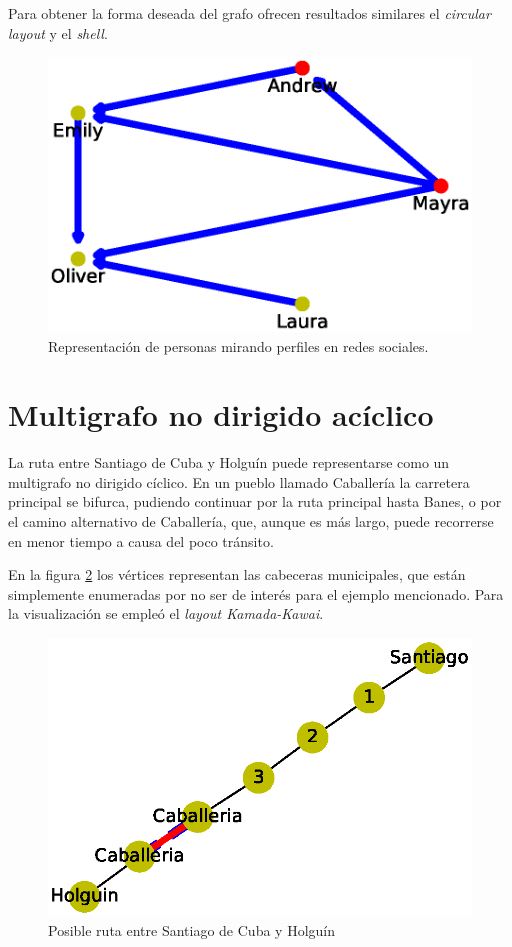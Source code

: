 \documentclass{article}
\begin{document}
Para obtener la forma deseada del grafo ofrecen resultados similares el \textit{circular layout} y el \textit{shell}.


\begin{figure}
\begin{center}
  \includegraphics[width=.6\columnwidth]{fig6.eps}
  \end{center}
  \vspace*{-12mm}
  \caption{Representación de personas mirando perfiles en redes sociales.}
  \label{Figura 6}
\end{figure}




\section{Multigrafo no dirigido acíclico}

La ruta entre Santiago de Cuba y Holguín puede representarse  como un multigrafo no dirigido cíclico. En un pueblo llamado Caballería la carretera principal se bifurca, pudiendo continuar por la ruta principal hasta Banes, o por el camino alternativo de Caballería, que, aunque es más largo, puede recorrerse en menor tiempo a causa del poco tránsito.

En la figura \ref{Figura 7} los vértices representan las cabeceras municipales, que están simplemente enumeradas por no ser de interés para el ejemplo mencionado. Para la visualización se empleó el \textit{layout Kamada-Kawai}.

\begin{figure}
  \includegraphics[width=.8\columnwidth]{fig7.eps}
  \vspace*{-16mm}
  \caption{Posible ruta entre Santiago de Cuba y Holguín}
  \label{Figura 7}
\end{figure}
\end{document}
